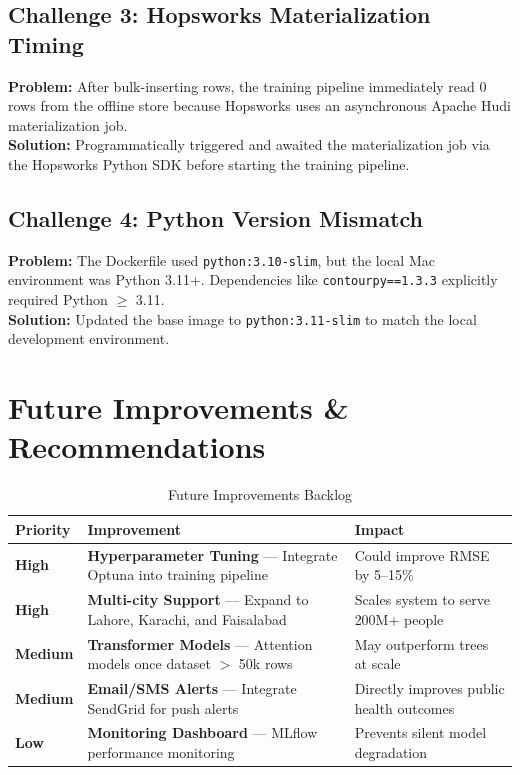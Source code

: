 \documentclass[11pt,a4paper]{article}
\begin{document}
\subsection{Challenge 3: Hopsworks Materialization Timing}
\textbf{Problem:} After bulk-inserting rows, the training pipeline immediately read 0 rows from the offline store because Hopsworks uses an asynchronous Apache Hudi materialization job.\\
\textbf{Solution:} Programmatically triggered and awaited the materialization job via the Hopsworks Python SDK before starting the training pipeline.

\subsection{Challenge 4: Python Version Mismatch}
\textbf{Problem:} The Dockerfile used \texttt{python:3.10-slim}, but the local Mac environment was Python 3.11+. Dependencies like \texttt{contourpy==1.3.3} explicitly required Python $\ge$ 3.11.\\
\textbf{Solution:} Updated the base image to \texttt{python:3.11-slim} to match the local development environment.

\newpage
\section{Future Improvements \& Recommendations}

\begin{table}[h!]
\centering
\small
\begin{tabularx}{\textwidth}{l l X}
\toprule
\textbf{Priority} & \textbf{Improvement} & \textbf{Impact} \\
\midrule
\textcolor{danger}{\textbf{High}} & \textbf{Hyperparameter Tuning} --- Integrate Optuna into training pipeline & Could improve RMSE by 5--15\% \\
\textcolor{danger}{\textbf{High}} & \textbf{Multi-city Support} --- Expand to Lahore, Karachi, and Faisalabad & Scales system to serve 200M+ people \\
\textcolor{warning}{\textbf{Medium}} & \textbf{Transformer Models} --- Attention models once dataset $>$ 50k rows & May outperform trees at scale \\
\textcolor{warning}{\textbf{Medium}} & \textbf{Email/SMS Alerts} --- Integrate SendGrid for push alerts & Directly improves public health outcomes \\
\textcolor{success}{\textbf{Low}} & \textbf{Monitoring Dashboard} --- MLflow performance monitoring & Prevents silent model degradation \\
\bottomrule
\end{tabularx}
\caption{Future Improvements Backlog}
\label{tab:future_work}
\end{table}
\end{document}
